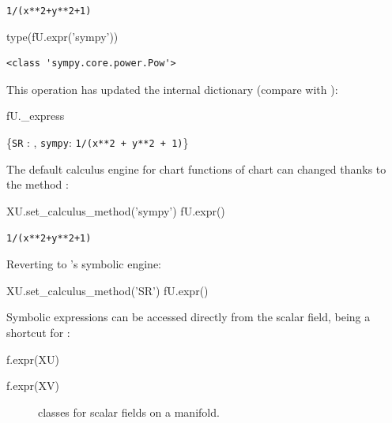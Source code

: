 \begin{NBout}
\verb|1/(x**2|\phantom{\verb!x!}\verb|+|\phantom{\verb!x!}\verb|y**2|\phantom{\verb!x!}\verb|+|\phantom{\verb!x!}\verb|1)|
\end{NBout}
\begin{NBin}
type(fU.expr('sympy'))
\end{NBin}
\begin{NBout}
\begin{verbatim}
<class 'sympy.core.power.Pow'>
\end{verbatim}
\end{NBout}
This operation has updated the internal dictionary 
(compare with ):
\begin{NBin}
fU._express
\end{NBin}
\begin{NBoutM}
\left\{\texttt{SR} : ,
\texttt{sympy}: \mbox{\texttt{1/(x**2 + y**2 + 1)}}\right\}
\end{NBoutM}
The default calculus engine for chart functions of chart  can
changed thanks to the method :
\begin{NBin}
XU.set_calculus_method('sympy')
fU.expr()
\end{NBin}
\begin{NBout}
\verb|1/(x**2|\phantom{\verb!x!}\verb|+|\phantom{\verb!x!}\verb|y**2|\phantom{\verb!x!}\verb|+|\phantom{\verb!x!}\verb|1)|
\end{NBout}
Reverting to \Sage{}'s symbolic engine:
\begin{NBin}
XU.set_calculus_method('SR')
fU.expr()
\end{NBin}
\begin{NBoutM}
\end{NBoutM}
Symbolic expressions can be accessed directly from the scalar field,
 being a shortcut for :
\begin{NBin}
f.expr(XU)
\end{NBin}
\begin{NBoutM}
\end{NBoutM}
\begin{NBin}
f.expr(XV)
\end{NBin}
\begin{NBoutM}
\end{NBoutM}

\begin{figure}
\begin{center}

\end{center}
\caption{\label{f:man:scalar_classes}\footnotesize
\Sage{} classes for scalar fields on a manifold.}
\end{figure}

